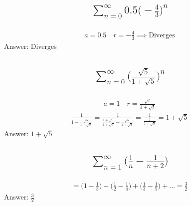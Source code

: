 \documentclass{article}
\begin{document}
\subsection{
	\begin{align*}
		\sum_{n = 0}^{\infty} 0.5 \bigg( -\frac{4}{3} \bigg)^n
	\end{align*}
}
\begin{align*}
	a = 0.5 \quad r = -\frac{4}{3} \implies \text{Diverges}
\end{align*}
Answer: Diverges

\subsection{
	\begin{align*}
		\sum_{n = 0}^{\infty} \bigg( \frac{\sqrt{5}}{1 + \sqrt{5}} \bigg)^n
	\end{align*}
}
\begin{align*}
	a = 1 \quad r = \frac{\sqrt{t}}{1 + \sqrt{t}}
\end{align*}
\begin{align*}
	\frac{1}{1 - \frac{\sqrt{5}}{1 + \sqrt{5}}} = \frac{1}{\frac{1 + \sqrt{5}}{1 + \sqrt{5}} - \frac{\sqrt{5}}{1 + \sqrt{5}}} = \frac{1}{\frac{1}{1 + \sqrt{5}}} = 1 + \sqrt{5}
\end{align*}
Answer: $1 + \sqrt{5}$

\subsection{
	\begin{align*}
		\sum_{n = 1}^{\infty} \bigg( \frac{1}{n} - \frac{1}{n + 2} \bigg)
	\end{align*}
}
\begin{align*}
	= \bigg( 1 - \frac{1}{3} \bigg) + \bigg( \frac{1}{2} - \frac{1}{4} \bigg) + \bigg( \frac{1}{3} - \frac{1}{5} \bigg) + \dots = \frac{3}{2}
\end{align*}
Answer: $\frac{3}{2}$


\end{document}

